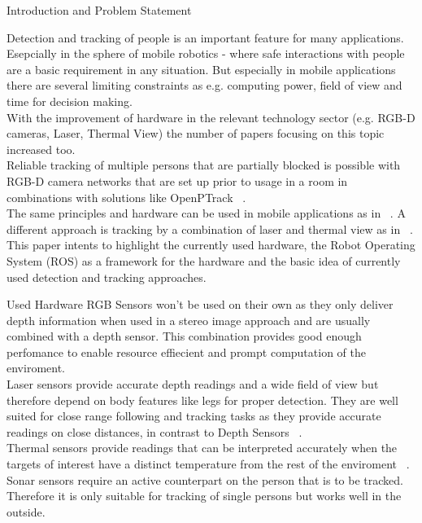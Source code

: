 \documentclass[a4paper,oneside,10pt,DIV12,headsepline,footexclude,headexclude]{scrartcl}
\begin{document}
\begin{section}{Introduction and Problem Statement}

Detection and tracking of people is an important feature for many applications.
Esepcially in the sphere of mobile robotics - where safe interactions with
people are a basic requirement in any situation. But especially in mobile 
applications there are several limiting constraints as e.g. computing power,
field of view and time for decision making.\\
With the improvement of hardware in the relevant technology sector (e.g. RGB-D cameras, 
Laser, Thermal View) the number of papers focusing on this topic increased too.\\
Reliable tracking of multiple persons that are partially blocked is 
possible with RGB-D camera networks that are set up prior to usage in a room in
combinations with solutions like OpenPTrack ~\cite{munaro2014openptrack}.\\
The same principles and hardware can be used in mobile applications as in 
~\cite{munaro2012tracking}. A different approach is tracking by a combination of 
laser and thermal view  as in ~\cite{7139259}.\\

This paper intents to highlight the currently used hardware, the Robot Operating
System (ROS) as a framework for the hardware and the basic idea of currently
used detection and tracking approaches. 

\begin{subsection}{Used Hardware}
RGB Sensors won't be used on their own as they only deliver depth information
when used in a stereo image approach and are usually combined with a depth sensor. 
This combination provides good enough perfomance to enable resource effiecient 
and prompt computation of the enviroment.\\
Laser sensors provide accurate depth readings and a wide field of view but therefore
depend on body features like legs for proper detection. They are well suited for
close range following and tracking tasks as they provide accurate readings on close
distances, in contrast to Depth Sensors ~\cite{7139259}.\\
Thermal sensors provide readings that can be interpreted accurately when the 
targets of interest have a distinct temperature from the rest of the enviroment ~\cite{ciric2013computationally}.\\
Sonar sensors require an active counterpart on the person that is to be tracked. 
Therefore it is only suitable for tracking of single persons but works well
in the outside.\\



\end{subsection}
\end{section}
\end{document}
